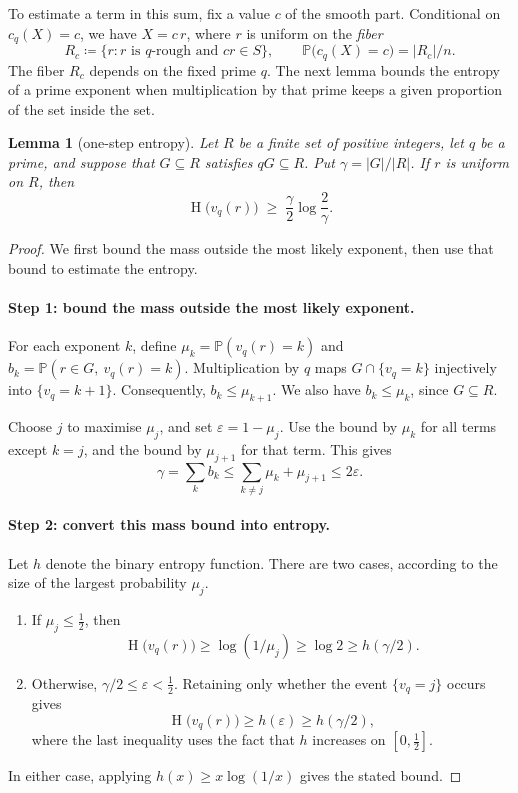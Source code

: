 \documentclass[11pt]{article}
\newtheorem{lemma}[theorem]{Lemma}
\theoremstyle{remark}
\newcommand{\Pp}{\mathbb{P}}
\DeclareMathOperator{\HH}{H}
\begin{document}
To estimate a term in this sum, fix a value $c$ of the smooth part.
Conditional on $c_q(X)=c$, we have $X=c\,r$, where $r$ is uniform on the \emph{fiber}
\[
  R_c\coloneqq\{r : r \text{ is $q$-rough and } cr\in S\},\qquad \Pp\bigl(c_q(X)=c\bigr)=|R_c|/n .
\]
The fiber $R_c$ depends on the fixed prime $q$.
The next lemma bounds the entropy of a prime exponent when multiplication by that prime keeps a given proportion of the set inside the set.

\begin{lemma}[one-step entropy]\label{lem:step}
Let $R$ be a finite set of positive integers, let $q$ be a prime, and suppose that $G\subseteq R$ satisfies $qG\subseteq R$.
Put $\gamma=|G|/|R|$.
If $r$ is uniform on $R$, then
\[
  \HH\bigl(v_q(r)\bigr)\;\ge\;\frac{\gamma}{2}\log\frac{2}{\gamma}.
\]
\end{lemma}

\begin{proof}
We first bound the mass outside the most likely exponent, then use that bound to estimate the entropy.

\paragraph{Step 1: bound the mass outside the most likely exponent.}
For each exponent $k$, define $\mu_k=\Pp(v_q(r)=k)$ and $b_k=\Pp(r\in G,\ v_q(r)=k)$.
Multiplication by $q$ maps $G\cap\{v_q=k\}$ injectively into $\{v_q=k+1\}$.
Consequently, $b_k\le\mu_{k+1}$.
We also have $b_k\le\mu_k$, since $G\subseteq R$.

Choose $j$ to maximise $\mu_j$, and set $\varepsilon=1-\mu_j$.
Use the bound by $\mu_k$ for all terms except $k=j$, and the bound by $\mu_{j+1}$ for that term.
This gives
\[
  \gamma=\sum_k b_k\le\sum_{k\ne j}\mu_k+\mu_{j+1}\le 2\varepsilon.
\]

\paragraph{Step 2: convert this mass bound into entropy.}
Let $h$ denote the binary entropy function.
There are two cases, according to the size of the largest probability $\mu_j$.
\begin{enumerate}[label=\emph{Case \arabic*.},leftmargin=*]
\item If $\mu_j\le\frac12$, then
\[
  \HH\bigl(v_q(r)\bigr)\ge\log(1/\mu_j)\ge\log 2\ge h(\gamma/2).
\]
\item Otherwise, $\gamma/2\le\varepsilon<\frac12$.
Retaining only whether the event $\{v_q=j\}$ occurs gives
\[
  \HH\bigl(v_q(r)\bigr)\ge h(\varepsilon)\ge h(\gamma/2),
\]
where the last inequality uses the fact that $h$ increases on $[0,\frac12]$.
\end{enumerate}
In either case, applying $h(x)\ge x\log(1/x)$ gives the stated bound.
\end{proof}
\end{document}
